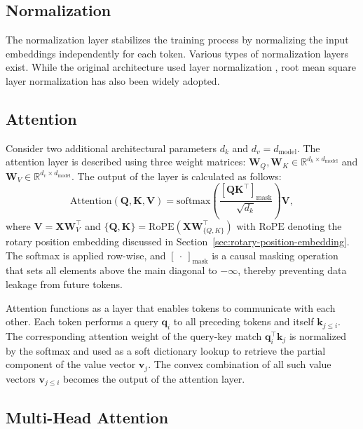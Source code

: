 \subsection{Normalization}

The normalization layer stabilizes the training process by normalizing the input embeddings independently for each token. Various types of normalization layers exist. While the original architecture used layer normalization \parencite{ba2016}, root mean square layer normalization \parencite{zhang2019} has also been widely adopted.

\subsection{Attention}

Consider two additional architectural parameters \(d_k\) and \(d_v = d_{\mathrm{model}}\). The attention layer is described using three weight matrices: \(\mathbf{W}_Q, \mathbf{W}_K \in \mathbb{R}^{d_k \times d_{\mathrm{model}}}\) and \(\mathbf{W}_V \in \mathbb{R}^{d_v \times d_{\mathrm{model}}}\). The output of the layer is calculated as follows:
\begin{equation}\label{eq:attention}
    \mathrm{Attention}(\mathbf{Q}, \mathbf{K}, \mathbf{V}) = \mathrm{softmax}\left(\frac{\left[\mathbf{QK}^\top\right]_{\mathrm{mask}}}{\sqrt{d_k}}\right)\mathbf{V},
\end{equation}
where \(\mathbf{V} = \mathbf{XW}_V^{\top}\) and \(\{\mathbf{Q}, \mathbf{K}\} = \mathrm{RoPE}(\mathbf{XW}_{\{Q, K\}}^\top)\) with \(\mathrm{RoPE}\) denoting the rotary position embedding discussed in Section~\ref{sec:rotary-position-embedding}. The softmax is applied row-wise, and \([\ \cdot \ ]_{\mathrm{mask}}\) is a causal masking operation that sets all elements above the main diagonal to \(-\infty\), thereby preventing data leakage from future tokens.

Attention functions as a layer that enables tokens to communicate with each other. Each token performs a query \(\mathbf{q}_i\) to all preceding tokens and itself \(\mathbf{k}_{j \le i}\). The corresponding attention weight of the query-key match \(\mathbf{q}_{i}^\top\mathbf{k}_{j}\) is normalized by the softmax and used as a soft dictionary lookup to retrieve the partial component of the value vector \(\mathbf{v}_j\). The convex combination of all such value vectors \(\mathbf{v}_{j \le i}\) becomes the output of the attention layer.

\subsection{Multi-Head Attention}


